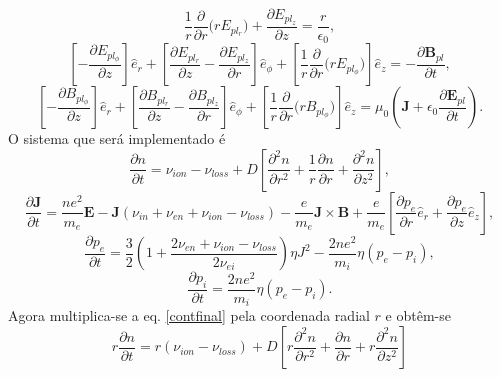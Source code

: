 \documentclass[12pt,oneside,a4paper]{abntex2}
\begin{document}
\begin{equation}
\frac{1}{r}  \frac{\partial}{\partial r} \big( r E_{pl_r} \big) +  \frac{\partial E_{pl_z}}{\partial z}   = \frac{r}{\epsilon_0},
\end{equation}
\begin{equation}
\left[- \frac{\partial E_{pl_\phi}}{\partial z} \right]  \hat{e}_r + \left[  \frac{\partial E_{pl_r}}{\partial z} -  \frac{\partial E_{pl_z}}{\partial r}  \right] \hat{e}_\phi + \left[ \frac{1}{r} \frac{\partial}{\partial r} \big( r E_{pl_\phi} \big)  \right] \hat{e}_z = -\frac{\partial \bm{B}_{pl}}{\partial t},
\end{equation}
\begin{equation}
\left[ - \frac{\partial B_{pl_\phi}}{\partial z} \right]  \hat{e}_r + \left[  \frac{\partial B_{pl_r}}{\partial z} -  \frac{\partial B_{pl_z}}{\partial r}  \right] \hat{e}_\phi + \left[ \frac{1}{r} \frac{\partial}{\partial r} \big( r B_{pl_\phi} \big) \right] \hat{e}_z = \mu_0 (\bm{J} + \epsilon_0 \frac{\partial \bm{E}_{pl}}{\partial t} ) .
\end{equation}
O sistema que será implementado é
\begin{equation}
\label{contfinal} 
\frac{\partial n}{\partial t} = \nu_{ion} - \nu_{loss}+D \left[  \frac{\partial^2 n}{\partial r^2} + \frac{1}{r} \frac{\partial n}{\partial r}  + \frac{\partial^2 n}{\partial z^2} \right] ,
\end{equation}
\begin{equation}
\frac{\partial \bm{J}}{\partial t} =  \frac{ne^2}{m_e} \bm{E} -\bm{J}(\nu_{in}+\nu_{en}+\nu_{ion}-\nu_{loss}) -\frac{e}{m_e}\bm{J} \times \bm{B}+\frac{e}{m_e} \left[ \frac{\partial p_e}{\partial r} \hat{e}_r + \frac{\partial p_e}{\partial z} \hat{e}_z \right],
\end{equation}
\begin{equation}
\frac{\partial p_e}{\partial t} = \frac{3}{2}(1+\frac{2 \nu_{en} + \nu_{ion} - \nu_{loss}}{2\nu_{ei}})\eta J^2  -\frac{2ne^2}{m_i} \eta (p_e-p_i),
\end{equation}
\begin{equation}
\frac{\partial p_i}{\partial t} = \frac{2ne^2}{m_i}\eta(p_e-p_i) .
\end{equation}
Agora multiplica-se a eq. \ref{contfinal} pela coordenada radial $r$  e obtêm-se
\begin{equation}
r \frac{\partial n}{\partial t} = r ( \nu_{ion} - \nu_{loss} ) +D \left[ r  \frac{\partial^2 n}{\partial r^2} +  \frac{\partial n}{\partial r}  + r \frac{\partial^2 n}{\partial z^2} \right] 
\end{equation}
\end{document}
